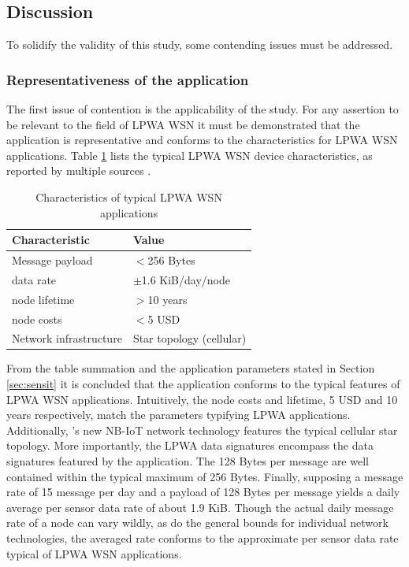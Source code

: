 \subsection{Discussion}
To solidify the validity of this study, some contending issues must be addressed.

\subsubsection{Representativeness of the \sensit application}
The first issue of contention is the applicability of the study. For any assertion to be relevant to the field of LPWA WSN it must be demonstrated that the \sensit application is representative and conforms to the characteristics for LPWA WSN applications. Table \ref{table:LPWA-chars} lists the typical LPWA WSN device characteristics, as reported by multiple sources \cite{lora_vs_sigfox_boek, lora_vs_sigfox_whitepaper, nbiot_vs_lora_vs_sigfox, lora_vs_sigfox, tmobile, nbiot}.

\begin{table}
\centering
\begin{tabular}{|l|l|}\hline
Characteristic & Value \\ \hline
Message payload & $<$256 Bytes	\\ \hline
data rate &	$\pm$1.6 KiB/day/node\footnotemark \\ \hline
node lifetime & $>$10 years \\ \hline
node costs & $<$5 USD \\ \hline
Network infrastructure & Star topology (cellular)	\\ \hline
\end{tabular}
\caption{Characteristics of typical LPWA WSN applications}
\label{table:LPWA-chars}
\end{table}


From the table summation and the application parameters stated in Section \ref{sec:sensit} it is concluded that the \sensit application conforms to the typical features of LPWA WSN applications. Intuitively, the node costs and lifetime, 5 USD and 10 years respectively, match the parameters typifying LPWA applications. Additionally, \sensitnospace 's new NB-IoT network technology features the typical cellular star topology. More importantly, the LPWA data signatures encompass the data signatures featured by the \sensit application. The 128 Bytes per message are well contained within the typical maximum of 256 Bytes. Finally, supposing a message rate of 15 message per day and a payload of 128 Bytes per message yields a daily average per sensor data rate of about 1.9 KiB. Though the actual daily message rate of a node can vary wildly, as do the general bounds for individual network technologies, the averaged rate conforms to the approximate per sensor data rate typical of LPWA WSN applications.

